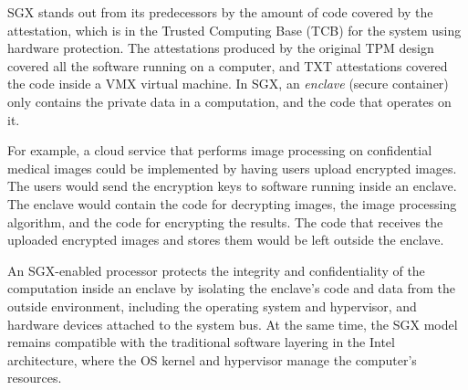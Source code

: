 SGX stands out from its predecessors by the amount of code covered by the
attestation, which is in the Trusted Computing Base (TCB) for the system using
hardware protection. The attestations produced by the original TPM design
covered all the software running on a computer, and TXT attestations covered
the code inside a VMX \cite{uhlig2005vmx} virtual machine. In SGX, an
\textit{enclave} (secure container) only contains the private data in a
computation, and the code that operates on it.

For example, a cloud service that performs image processing on confidential
medical images could be implemented by having users upload encrypted images.
The users would send the encryption keys to software running inside an enclave.
The enclave would contain the code for decrypting images, the image processing
algorithm, and the code for encrypting the results. The code that receives the
uploaded encrypted images and stores them would be left outside the enclave.

An SGX-enabled processor protects the integrity and confidentiality of the
computation inside an enclave by isolating the enclave's code and data from the
outside environment, including the operating system and hypervisor, and
hardware devices attached to the system bus. At the same time, the SGX model
remains compatible with the traditional software layering in the Intel
architecture, where the OS kernel and hypervisor manage the computer's
resources.
